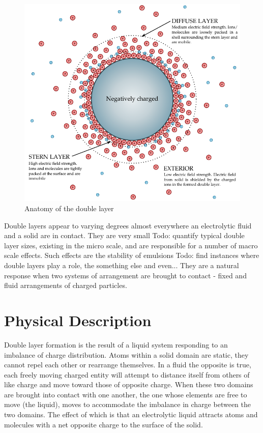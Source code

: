 
\begin{figure}
    \begin{center}
        \includegraphics{content/introduction/graphics/doubleLayer_labelled.pdf}
    \end{center}
    \caption{Anatomy of the double layer}
    \label{fig:doubleLayer_anatomy}
\end{figure}

Double layers appear to varying degrees almost everywhere an electrolytic fluid and a solid are in contact. They are very small {Todo: quantify typical double layer sizes}, existing in the micro scale, and are responsible for a number of macro scale effects. Such effects are the stability of emulsions {Todo: find instances where double layers play a role}, the something else and even... They are a natural response when two systems of arrangement are brought to contact - fixed and fluid arrangements of charged particles.

\section{Physical Description}
    Double layer formation is the result of a liquid system responding to an imbalance of charge distribution. Atoms within a solid domain are static, they cannot repel each other or rearrange themselves. In a fluid the opposite is true, each freely moving charged entity will attempt to distance itself from others of like charge and move toward those of opposite charge. When these two domains are brought into contact with one another, the one whose elements are free to move (the liquid), moves to accommodate the imbalance in charge between the two domains. The effect of which is that an electrolytic liquid attracts atoms and molecules with a net opposite charge to the surface of the solid.

